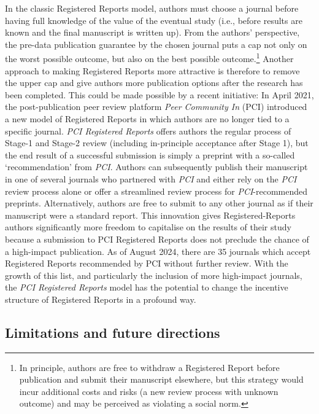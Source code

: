 \documentclass[
  ,man,mask,floatsintext]{apa6}
\begin{document}
In the classic Registered Reports model, authors must choose a journal before having full knowledge of the value of the eventual study (i.e., before results are known and the final manuscript is written up).
From the authors' perspective, the pre-data publication guarantee by the chosen journal puts a cap not only on the worst possible outcome, but also on the best possible outcome.\footnote{In principle, authors are free to withdraw a Registered Report before publication and submit their manuscript elsewhere, but this strategy would incur additional costs and risks (a new review process with unknown outcome) and may be perceived as violating a social norm.}
Another approach to making Registered Reports more attractive is therefore to remove the upper cap and give authors more publication options after the research has been completed.
This could be made possible by a recent initiative:
In April 2021, the post-publication peer review platform \emph{Peer Community In} (PCI) introduced a new model of Registered Reports in which authors are no longer tied to a specific journal.
\emph{PCI Registered Reports} offers authors the regular process of Stage-1 and Stage-2 review (including in-principle acceptance after Stage 1), but the end result of a successful submission is simply a preprint with a so-called `recommendation' from \emph{PCI}.
Authors can subsequently publish their manuscript in one of several journals who partnered with \emph{PCI} and either rely on the \emph{PCI} review process alone or offer a streamlined review process for \emph{PCI}-recommended preprints.
Alternatively, authors are free to submit to any other journal as if their manuscript were a standard report.
This innovation gives Registered-Reports authors significantly more freedom to capitalise on the results of their study because a submission to PCI Registered Reports does not preclude the chance of a high-impact publication.
As of August 2024, there are 35 journals which accept Registered Reports recommended by PCI without further review.
With the growth of this list, and particularly the inclusion of more high-impact journals, the \emph{PCI Registered Reports} model has the potential to change the incentive structure of Registered Reports in a profound way.

\hypertarget{limitations-and-future-directions}{%
\subsection{Limitations and future directions}\label{limitations-and-future-directions}}
\end{document}
